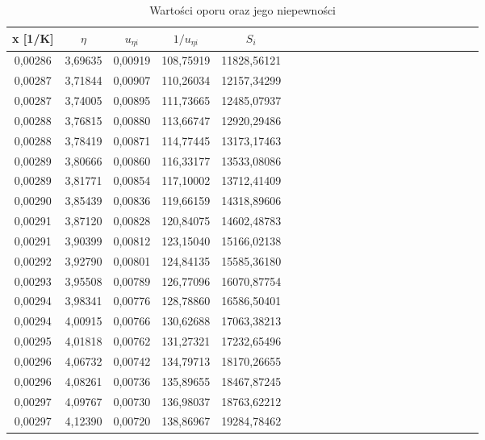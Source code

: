 \documentclass[10pt,a4paper]{article}
\begin{document}
\begin{center}
\begin{center}
 \begin{table}[h!]
 \centering
 \caption{Wartości oporu oraz jego niepewności}
 \label{t3}
 \begin{tabular}{|c|c|c|c|c|c|c|c|c|c|c|c|c|c|c|c|c|c|c|c|c|c|}
\hline 
 x [1/K] & $\eta$ & $u_{\eta i}$ & $1/u_{\eta i}$       & $S_{i}$\\ \hline
0,00286  & 3,69635   & 0,00919 & 108,75919 & 11828,56121              \\ \hline
0,00287  & 3,71844   & 0,00907 & 110,26034 & 12157,34299              \\ \hline
0,00287  & 3,74005   & 0,00895 & 111,73665 & 12485,07937              \\ \hline
0,00288  & 3,76815   & 0,00880 & 113,66747 & 12920,29486              \\ \hline
0,00288  & 3,78419   & 0,00871 & 114,77445 & 13173,17463              \\ \hline
0,00289  & 3,80666   & 0,00860 & 116,33177 & 13533,08086              \\ \hline
0,00289  & 3,81771   & 0,00854 & 117,10002 & 13712,41409              \\ \hline
0,00290  & 3,85439   & 0,00836 & 119,66159 & 14318,89606              \\ \hline
0,00291  & 3,87120   & 0,00828 & 120,84075 & 14602,48783              \\ \hline
0,00291  & 3,90399   & 0,00812 & 123,15040 & 15166,02138              \\ \hline
0,00292  & 3,92790   & 0,00801 & 124,84135 & 15585,36180              \\ \hline
0,00293  & 3,95508   & 0,00789 & 126,77096 & 16070,87754              \\ \hline
0,00294  & 3,98341   & 0,00776 & 128,78860 & 16586,50401              \\ \hline
0,00294  & 4,00915   & 0,00766 & 130,62688 & 17063,38213              \\ \hline
0,00295  & 4,01818   & 0,00762 & 131,27321 & 17232,65496              \\ \hline
0,00296  & 4,06732   & 0,00742 & 134,79713 & 18170,26655              \\ \hline
0,00296  & 4,08261   & 0,00736 & 135,89655 & 18467,87245              \\ \hline
0,00297  & 4,09767   & 0,00730 & 136,98037 & 18763,62212              \\ \hline
0,00297  & 4,12390   & 0,00720 & 138,86967 & 19284,78462              \\ \hline

\end{tabular}
\end{table}
\end{center}
\end{center}
\end{document}
